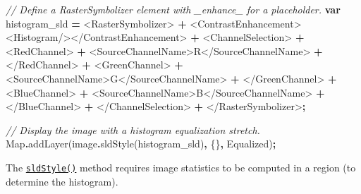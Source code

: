\documentclass[
]{article}
\newenvironment{Shaded}{\begin{snugshade}}{\end{snugshade}}
\newcommand{\BuiltInTok}[1]{#1}
\newcommand{\CommentTok}[1]{\textcolor[rgb]{0.56,0.35,0.01}{\textit{#1}}}
\newcommand{\FunctionTok}[1]{\textcolor[rgb]{0.00,0.00,0.00}{#1}}
\newcommand{\KeywordTok}[1]{\textcolor[rgb]{0.13,0.29,0.53}{\textbf{#1}}}
\newcommand{\NormalTok}[1]{#1}
\newcommand{\OperatorTok}[1]{\textcolor[rgb]{0.81,0.36,0.00}{\textbf{#1}}}
\newcommand{\StringTok}[1]{\textcolor[rgb]{0.31,0.60,0.02}{#1}}
\begin{document}
\begin{enumerate}
\begin{Shaded}
\begin{Highlighting}[]
\CommentTok{// Define a RasterSymbolizer element with \textquotesingle{}\_enhance\_\textquotesingle{} for a placeholder.}
  \KeywordTok{var}\NormalTok{ histogram\_sld }\OperatorTok{=}
    \StringTok{\textquotesingle{}\textless{}RasterSymbolizer\textgreater{}\textquotesingle{}} \OperatorTok{+}
      \StringTok{\textquotesingle{}\textless{}ContrastEnhancement\textgreater{}\textless{}Histogram/\textgreater{}\textless{}/ContrastEnhancement\textgreater{}\textquotesingle{}} \OperatorTok{+}
      \StringTok{\textquotesingle{}\textless{}ChannelSelection\textgreater{}\textquotesingle{}} \OperatorTok{+}
        \StringTok{\textquotesingle{}\textless{}RedChannel\textgreater{}\textquotesingle{}} \OperatorTok{+}
          \StringTok{\textquotesingle{}\textless{}SourceChannelName\textgreater{}R\textless{}/SourceChannelName\textgreater{}\textquotesingle{}} \OperatorTok{+}
        \StringTok{\textquotesingle{}\textless{}/RedChannel\textgreater{}\textquotesingle{}} \OperatorTok{+}
        \StringTok{\textquotesingle{}\textless{}GreenChannel\textgreater{}\textquotesingle{}} \OperatorTok{+}
          \StringTok{\textquotesingle{}\textless{}SourceChannelName\textgreater{}G\textless{}/SourceChannelName\textgreater{}\textquotesingle{}} \OperatorTok{+}
        \StringTok{\textquotesingle{}\textless{}/GreenChannel\textgreater{}\textquotesingle{}} \OperatorTok{+}
        \StringTok{\textquotesingle{}\textless{}BlueChannel\textgreater{}\textquotesingle{}} \OperatorTok{+}
          \StringTok{\textquotesingle{}\textless{}SourceChannelName\textgreater{}B\textless{}/SourceChannelName\textgreater{}\textquotesingle{}} \OperatorTok{+}
        \StringTok{\textquotesingle{}\textless{}/BlueChannel\textgreater{}\textquotesingle{}} \OperatorTok{+}
      \StringTok{\textquotesingle{}\textless{}/ChannelSelection\textgreater{}\textquotesingle{}} \OperatorTok{+}
    \StringTok{\textquotesingle{}\textless{}/RasterSymbolizer\textgreater{}\textquotesingle{}}\OperatorTok{;}

  \CommentTok{// Display the image with a histogram equalization stretch.}
  \BuiltInTok{Map}\OperatorTok{.}\FunctionTok{addLayer}\NormalTok{(image}\OperatorTok{.}\FunctionTok{sldStyle}\NormalTok{(histogram\_sld)}\OperatorTok{,}\NormalTok{ \{\}}\OperatorTok{,} \StringTok{\textquotesingle{}Equalized\textquotesingle{}}\NormalTok{)}\OperatorTok{;}
\end{Highlighting}
\end{Shaded}

  The \href{https://devsite.googleplex.com/earth-engine/image_visualization\#styled-layer-descriptors}{\texttt{sldStyle()}} method requires image statistics to be computed in a region (to determine the histogram).
\end{enumerate}
\end{document}
